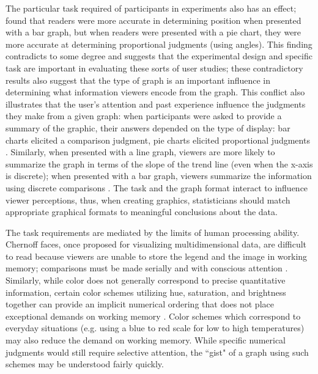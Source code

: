 \documentclass[11pt]{isuthesis}\usepackage[]{graphicx}\usepackage[]{color}
\begin{document}
The particular task required of participants in experiments also has an effect; \citet{simkin1987information} found that readers were more accurate in determining position when presented with a bar graph, but when readers were presented with a pie chart, they were more accurate at determining proportional judgments (using angles). This finding contradicts \citet{cleveland:1984} to some degree and suggests that the experimental design and specific task are important in evaluating these sorts of user studies; these contradictory results also suggest that the type of graph is an important influence in determining what information viewers encode from the graph. This conflict also illustrates that the user's attention and past experience influence the judgments they make from a given graph: when participants were asked to provide a summary of the graphic, their answers depended on the type of display: bar charts elicited a comparison judgment, pie charts elicited proportional judgments \citep{simkin1987information}. Similarly, when presented with a line graph, viewers are more likely to summarize the graph in terms of the slope of the trend line (even when the x-axis is discrete); when presented with a bar graph, viewers summarize the information using discrete comparisons \citep{carswell1987information, shah2005cambridge}. The task and the graph format interact to influence viewer perceptions, thus, when creating graphics, statisticians should match appropriate graphical formats to meaningful conclusions about the data. 

The task requirements are mediated by the limits of human processing ability. Chernoff faces, once proposed for visualizing multidimensional data, are difficult to read because viewers are unable to store the legend and the image in working memory; comparisons must be made serially and with conscious attention \citep{shah2005cambridge}. Similarly, while color does not generally correspond to precise quantitative information, certain color schemes utilizing hue, saturation, and brightness together can provide an implicit numerical ordering that does not place exceptional demands on working memory \citep{shah2005cambridge}. Color schemes which correspond to everyday situations (e.g. using a blue to red scale for low to high temperatures) may also reduce the demand on working memory. While specific numerical judgments would still require selective attention, the ``gist" of a graph using such schemes may be understood fairly quickly. 
\end{document}
